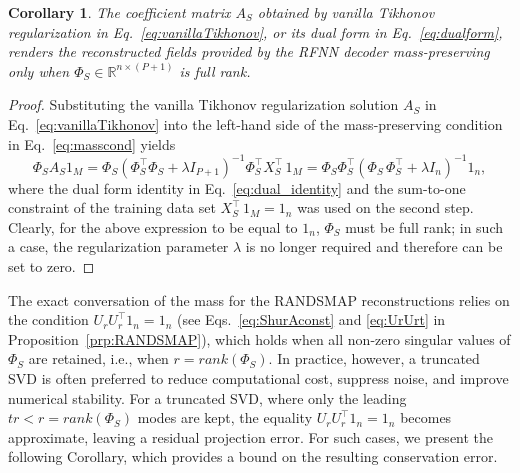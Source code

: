 \documentclass{article}
\newtheorem{corollary}{Corollary}
\begin{document}
\begin{corollary}
The coefficient matrix $A_S$ obtained by vanilla Tikhonov regularization in Eq.~\eqref{eq:vanillaTikhonov}, or its dual form in Eq.~\eqref{eq:dualform}, renders the reconstructed fields provided by the RFNN decoder mass-preserving only when $\Phi_S \in \mathbb{R}^{n\times (P+1)}$ is full rank.
\end{corollary}
\begin{proof}
Substituting the vanilla Tikhonov regularization solution $A_S$  in Eq.~\eqref{eq:vanillaTikhonov} into the left-hand side of the mass-preserving condition in Eq.~\eqref{eq:masscond} yields
\begin{equation}
   \Phi_S A_S 1_M=\Phi_S (\Phi_S^\top \Phi_S+\lambda I_{P+1})^{-1}\Phi_S^\top X^{\top}_S\,1_M=\Phi_S \Phi_S^\top (\Phi_S\,\Phi_S^\top +\lambda I_n)^{-1} 1_n,
\end{equation}
where the dual form identity in Eq.~\eqref{eq:dual_identity} and the sum-to-one constraint of the training data set $X^{\top}_S\,1_M=1_n$ was used on the second step. Clearly, for the above expression to be equal to $1_n$, $\Phi_S$ must be full rank; in such a case, the regularization parameter $\lambda$ is no longer required and therefore can be set to zero.
\end{proof}
The exact conversation of the mass for the RANDSMAP reconstructions relies on the condition $U_r U_r^\top 1_n = 1_n$ (see Eqs.~\eqref{eq:ShurAconst} and \eqref{eq:UrUrt} in Proposition~\ref{prp:RANDSMAP}), which holds when all non-zero singular values of $\Phi_S$ are retained, i.e., when  $r = rank(\Phi_S)$. In practice, however, a truncated SVD is often preferred to reduce computational cost, suppress noise, and improve numerical stability. For a truncated SVD, where only the leading $tr < r=rank(\Phi_S)$ modes are kept, the equality $U_r U_r^\top 1_n = 1_n$ becomes approximate, leaving a residual projection error. For such cases, we present the following Corollary, which provides a bound on the resulting conservation error.
\end{document}
